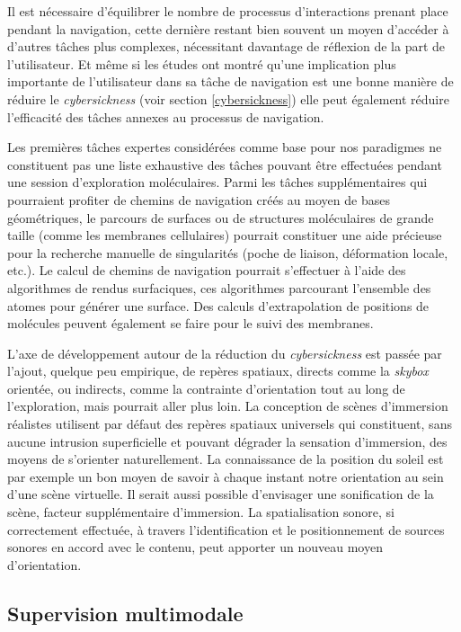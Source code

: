 Il est nécessaire d'équilibrer le nombre de processus d'interactions prenant place pendant la navigation, cette dernière restant bien souvent un moyen d'accéder à d'autres tâches plus complexes, nécessitant davantage de réflexion de la part de l'utilisateur. Et même si les études ont montré qu'une implication plus importante de l'utilisateur dans sa tâche de navigation est une bonne manière de réduire le \textit{cybersickness} (voir section \ref{cybersickness}) elle peut également réduire l'efficacité des tâches annexes au processus de navigation.

Les premières tâches expertes considérées comme base pour nos paradigmes ne constituent pas une liste exhaustive des tâches pouvant être effectuées pendant une session d'exploration moléculaires. Parmi les tâches supplémentaires qui pourraient profiter de chemins de navigation créés au moyen de bases géométriques, le parcours de surfaces ou de structures moléculaires de grande taille (comme les membranes cellulaires) pourrait constituer une aide précieuse pour la recherche manuelle de singularités (poche de liaison, déformation locale, etc.). Le calcul de chemins de navigation pourrait s'effectuer à l'aide des algorithmes de rendus surfaciques, ces algorithmes parcourant l'ensemble des atomes pour générer une surface. Des calculs d'extrapolation de positions de molécules peuvent également se faire pour le suivi des membranes.

L'axe de développement autour de la réduction du \textit{cybersickness} est passée par l'ajout, quelque peu empirique, de repères spatiaux, directs comme la \textit{skybox} orientée, ou indirects, comme la contrainte d'orientation tout au long de l'exploration, mais pourrait aller plus loin. La conception de scènes d'immersion réalistes utilisent par défaut des repères spatiaux universels qui constituent, sans aucune intrusion superficielle et pouvant dégrader la sensation d'immersion, des moyens de s'orienter naturellement. La connaissance de la position du soleil est par exemple un bon moyen de savoir à chaque instant notre orientation au sein d'une scène virtuelle.
Il serait aussi possible d'envisager une sonification de la scène, facteur supplémentaire d'immersion. La spatialisation sonore, si correctement effectuée, à travers l'identification et le positionnement de sources sonores en accord avec le contenu, peut apporter un nouveau moyen d'orientation.

\subsection*{Supervision multimodale}

